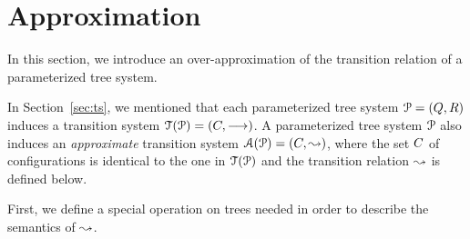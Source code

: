 \section{Approximation}
\label{sec:approx}
%
In this section, we introduce an over-approximation of the transition relation 
of a parameterized tree system.
%

In Section~\ref{sec:ts}, we mentioned that each parameterized tree system ${\EuScript P}=
\left(Q,R\right)$ induces a transition system ${\EuScript T}({{\EuScript P}})=\left(C,\stackrel{}\longrightarrow\right)$.
%
A parameterized tree system ${\EuScript P}$ also induces an \emph{approximate} transition system
${\EuScript A}({{\EuScript P}})=\left(C,\stackrel{}\leadsto\right)$, where the set $C$ of configurations 
is identical to the one in ${\EuScript T}({{\EuScript P}})$ and the transition relation $\stackrel{}\leadsto$ 
is defined below.
%

First, we define a special operation on trees needed in order to describe the semantics of 
$\stackrel{}\leadsto$.
%

